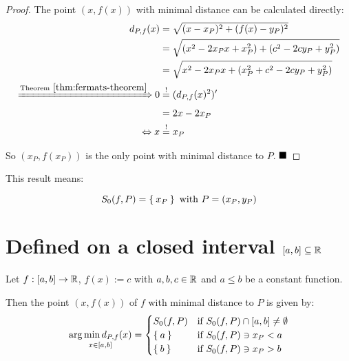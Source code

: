 \begin{proof}
The point $(x, f(x))$ with minimal distance can be calculated directly:
\begin{align}
    d_{P,f}(x) &= \sqrt{(x - x_P)^2 + (f(x) - y_P)^2}\\
               &= \sqrt{(x^2 - 2x_P x + x_P^2) + (c^2 - 2 c y_P + y_P^2)} \\
               &= \sqrt{x^2 - 2 x_P x + (x_P^2 + c^2 - 2 c y_P + y_P^2)}\label{eq:constant-function-distance}\\
 \xRightarrow{\text{Theorem}~\ref{thm:fermats-theorem}} 0 &\stackrel{!}{=} (d_{P,f}(x)^2)'\\
              &= 2x - 2x_P\\
  \Leftrightarrow x &\stackrel{!}{=} x_P
\end{align}

So $(x_P,f(x_P))$ is the only point with minimal distance to $P$. $\qed$
\end{proof}

This result means:

\[S_0(f, P) = \Set{x_P} \text{ with } P = (x_P, y_P)\]
\clearpage

\section{Defined on a closed interval $[a,b] \subseteq \mathbb{R}$}
\begin{theorem}
Let $f:[a,b] \rightarrow \mathbb{R}$, $f(x) := c$ with $a,b,c \in \mathbb{R}$ and 
$a \leq b$ be a constant function. 

Then the point $(x, f(x))$ of $f$ with minimal distance to $P$ is
given by:
\[\underset{x\in [a,b]}{\arg \min d_{P,f}(x)} = \begin{cases}
 S_0(f,P) &\text{if } S_0(f,P) \cap [a,b] \neq \emptyset \\
  \Set{a} &\text{if } S_0(f,P) \ni x_P < a\\
  \Set{b} &\text{if } S_0(f,P) \ni x_P > b
    \end{cases}\]
\end{theorem}

